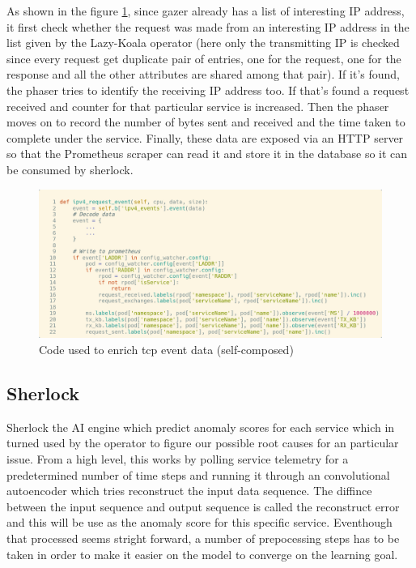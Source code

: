 As shown in the figure \ref{fig:gazer-enrich}, since gazer already has a list of interesting IP address, it first check whether the request was made from an interesting IP address in the list given by the Lazy-Koala operator (here only the transmitting IP is checked since every request get duplicate pair of entries, one for the request, one for the response and all the other attributes are shared among that pair). If it's found, the phaser tries to identify the receiving IP address too. If that's found a request received and counter for that particular service is increased. Then the phaser moves on to record the number of bytes sent and received and the time taken to complete under the service. Finally, these data are exposed via an HTTP server so that the Prometheus scraper can read it and store it in the database so it can be consumed by sherlock.

\begin{figure}[H]
    \includegraphics[width=14cm]{assets/implementation/gazer-enrich.png}
    \caption{Code used to enrich tcp event data (self-composed)}
    \label{fig:gazer-enrich}
\end{figure}


\subsection{Sherlock}

Sherlock the AI engine which predict anomaly scores for each service which in turned used by the operator to figure our possible root causes for an particular issue. From a high level, this works by polling service telemetry for a predetermined number of time steps and running it through an convolutional autoencoder which tries reconstruct the input data sequence. The diffince between the input sequence and output sequence is called the reconstruct error and this will be use as the anomaly score for this specific service. Eventhough that processed seems stright forward, a number of prepocessing steps has to be taken in order to make it easier on the model to converge on the learning goal.

